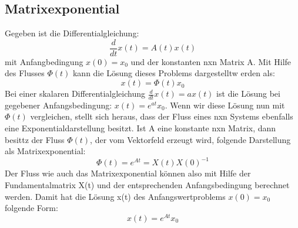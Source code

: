 \subsection{Matrixexponential}
Gegeben ist die Differentialgleichung:
\begin{equation*}
\frac{d}{dt}x(t) = A(t)x(t)
\end{equation*}
mit Anfangbedingung $x(0) = x_0$ und der konstanten nxn Matrix A. Mit Hilfe des Flusses $\Phi(t)$ kann die Lösung dieses Problems dargestelltw erden als: 
\begin{equation*}
x(t) = \Phi(t)x_0
\end{equation*}
Bei einer skalaren Differentialgleichung $\frac{d}{dt}x(t) = ax(t)$ ist die Lösung bei gegebener Anfangsbedingung: $x(t) = e^{at}x_0$. Wenn wir diese Lösung nun mit $\Phi(t)$ vergleichen, stellt sich heraus, dass der Fluss eines nxn Systems ebenfalls eine Exponentialdarstellung besitzt. 
Ist A eine konstante nxn Matrix, dann besittz der Fluss $\Phi(t)$, der vom Vektorfeld erzeugt wird, folgende Darstellung als Matrixexponential: 
\begin{equation*}
\Phi(t) = e^{At} = X(t)X(0)^{-1}
\end{equation*}
Der Fluss wie auch das Matrixexponential können also mit Hilfe der Fundamentalmatrix X(t) und der entsprechenden Anfangsbedingung berechnet werden.
Damit hat die Lösung x(t) des Anfangswertproblems $x(0) = x_0$ folgende Form: 
\begin{equation*}
x(t) = e^{At}x_0
\end{equation*}
